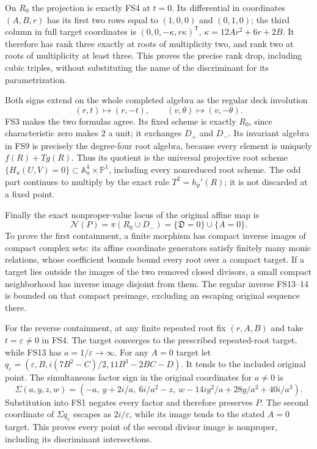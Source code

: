 \documentclass[11pt]{article}
\begin{document}
On $R_0$ the projection is exactly FS4 at $t=0$.
Its differential in coordinates $(A,B,r)$ has its first
two rows equal to $(1,0,0)$ and $(0,1,0)$; the third
column in full target coordinates is
$(0,0,-\kappa,r\kappa)^{\mathsf T}$,
$\kappa=12Ar^2+6r+2B$.
It therefore has rank three exactly at roots of
multiplicity two, and rank two at roots of multiplicity
at least three. This proves the precise rank drop,
including cubic triples, without substituting the name
of the discriminant for its parametrization.

Both signs extend on the whole completed algebra as the
regular deck involution
\begin{equation}
(r,t)\mapsto(r,-t),\qquad
(v,\theta)\mapsto(v,-\theta).
\tag{FS30}
\end{equation}
FS3 makes the two formulas agree. Its fixed scheme is
exactly $R_0$, since characteristic zero makes $2$ a unit;
it exchanges $D_+$ and $D_-$. Its invariant algebra
in FS9 is precisely the degree-four root algebra, because
every element is uniquely $f(R)+Tg(R)$.
Thus its quotient is the universal projective root scheme
$\{H_u(U,V)=0\}\subset\mathbb A^4_u\times\mathbb P^1$,
including every nonreduced root scheme. The odd part
continues to multiply by the exact rule $T^2=h_p'(R)$;
it is not discarded at a fixed point.

Finally the exact nonproper-value locus of the original
affine map is
\begin{equation}
\mathcal N(P)=\pi(R_0\cup D_-)
            =\{\mathfrak D=0\}\cup\{A=0\}.
\tag{FS31}
\end{equation}
To prove the first containment, a finite morphism has
compact inverse images of compact complex sets: its
affine coordinate generators satisfy finitely many
monic relations, whose coefficient bounds bound every
root over a compact target. If a target lies outside
the images of the two removed closed divisors, a small
compact neighborhood has inverse image disjoint from
them. The regular inverse FS13--14 is bounded on that
compact preimage, excluding an escaping original
sequence there.

For the reverse containment, at any finite repeated root
fix $(r,A,B)$ and take $t=\varepsilon\ne0$ in FS4.
The target converges to the prescribed repeated-root
target, while FS13 has $a=1/\varepsilon\to\infty$.
For any $A=0$ target let
$q_\varepsilon=(\varepsilon,B,i(7B^2-C)/2,11B^3-2BC-D)$.
It tends to the included original point. The simultaneous
factor sign in the original coordinates for $a\ne0$ is
\[
\Sigma(a,y,z,w)=
(-a,\ y+2i/a,\ 6i/a^2-z,\
 w-14iy^2/a+28y/a^2+40i/a^3).
\]
Substitution into FS1 negates every factor and therefore
preserves $P$. The second coordinate of
$\Sigma q_\varepsilon$ escapes as $2i/\varepsilon$,
while its image tends to the stated $A=0$ target.
This proves every point of the second divisor image is
nonproper, including its discriminant intersections.
\end{document}
